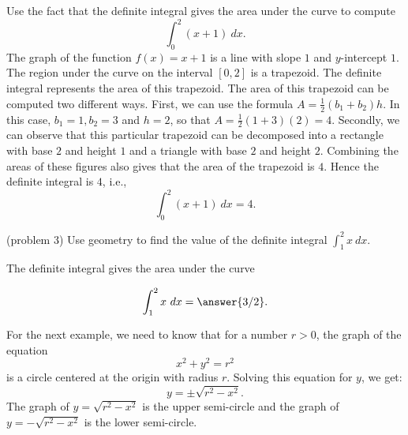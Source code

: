 \documentclass[handout]{ximera}
\begin{document}
\begin{example}[example 3]
Use the fact that the definite integral gives the area under the curve to compute
\[\int_0^2 (x+1) \ dx.\]
The graph of the function $f(x) = x+1$ is a line with slope $1$ and $y$-intercept $1$. 
The region under the curve on the interval $[0, 2]$ is a trapezoid.  
The definite integral represents the area of this trapezoid. The area of this trapezoid can be computed two different ways.  
First, we can use the formula $A = \frac12 (b_1 + b_2)h$. 
In this case, $b_1 = 1, b_2 = 3$ and $h = 2$, so that $A = \frac12 (1+3)(2) = 4$.  
Secondly, we can observe that this particular trapezoid can be decomposed into a 
rectangle with base $2$ and height $1$ and a triangle with base $2$ and height $2$. 
Combining the areas of these figures also gives that the area of the trapezoid is $4$.
Hence the definite integral is $4$, i.e.,
\[\int_0^2 (x+1) \ dx = 4.\]
 




\begin{image}
\end{image}

\end{example}


\begin{problem}(problem 3)
Use geometry to find the value of the definite integral $\displaystyle{\int_{1}^{2} x \ dx}.$
\begin{hint}
The definite integral gives the area under the curve
\end{hint}
\[\int_{1}^{2} x \ dx = \answer{3/2}.\]
\end{problem}

For the next example, we need to know that for a number $r>0$,
the graph of the equation
\[x^2 + y^2 = r^2\]
is a circle centered at the origin with radius $r$.
Solving this equation for $y$, we get:
\[y = \pm \sqrt{r^2 - x^2}.\]
The graph of $y = \sqrt{r^2 -x^2}$ is the upper semi-circle and the
graph of $y = -\sqrt{r^2 -x^2}$ is the lower semi-circle.
\end{document}
